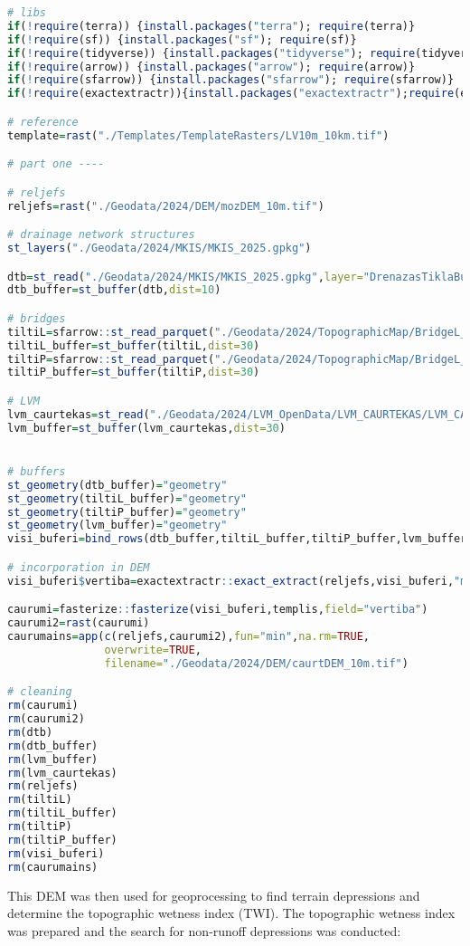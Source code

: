 \documentclass[
]{book}
\begin{document}
\begin{lstlisting}[language=R]
# libs
if(!require(terra)) {install.packages("terra"); require(terra)}
if(!require(sf)) {install.packages("sf"); require(sf)}
if(!require(tidyverse)) {install.packages("tidyverse"); require(tidyverse)}
if(!require(arrow)) {install.packages("arrow"); require(arrow)}
if(!require(sfarrow)) {install.packages("sfarrow"); require(sfarrow)}
if(!require(exactextractr)){install.packages("exactextractr");require(exactextractr)}

# reference
template=rast("./Templates/TemplateRasters/LV10m_10km.tif")

# part one ----

# reljefs
reljefs=rast("./Geodata/2024/DEM/mozDEM_10m.tif")

# drainage network structures
st_layers("./Geodata/2024/MKIS/MKIS_2025.gpkg")

dtb=st_read("./Geodata/2024/MKIS/MKIS_2025.gpkg",layer="DrenazasTiklaBuves")
dtb_buffer=st_buffer(dtb,dist=10)

# bridges 
tiltiL=sfarrow::st_read_parquet("./Geodata/2024/TopographicMap/BridgeL_COMB.parquet")
tiltiL_buffer=st_buffer(tiltiL,dist=30)
tiltiP=sfarrow::st_read_parquet("./Geodata/2024/TopographicMap/BridgeL_COMB.parquet")
tiltiP_buffer=st_buffer(tiltiP,dist=30)

# LVM
lvm_caurtekas=st_read("./Geodata/2024/LVM_OpenData/LVM_CAURTEKAS/LVM_CAURTEKAS_Shape.shp")
lvm_buffer=st_buffer(lvm_caurtekas,dist=30)


# buffers
st_geometry(dtb_buffer)="geometry"
st_geometry(tiltiL_buffer)="geometry"
st_geometry(tiltiP_buffer)="geometry"
st_geometry(lvm_buffer)="geometry"
visi_buferi=bind_rows(dtb_buffer,tiltiL_buffer,tiltiP_buffer,lvm_buffer)

# incorporation in DEM
visi_buferi$vertiba=exactextractr::exact_extract(reljefs,visi_buferi,"min")

caurumi=fasterize::fasterize(visi_buferi,templis,field="vertiba")
caurumi2=rast(caurumi)
caurumains=app(c(reljefs,caurumi2),fun="min",na.rm=TRUE,
               overwrite=TRUE,
               filename="./Geodata/2024/DEM/caurtDEM_10m.tif")

# cleaning
rm(caurumi)
rm(caurumi2)
rm(dtb)
rm(dtb_buffer)
rm(lvm_buffer)
rm(lvm_caurtekas)
rm(reljefs)
rm(tiltiL)
rm(tiltiL_buffer)
rm(tiltiP)
rm(tiltiP_buffer)
rm(visi_buferi)
rm(caurumains)
\end{lstlisting}

This DEM was then used for geoprocessing to find terrain depressions and
determine the topographic wetness index (TWI). The topographic
wetness index was prepared and the search for non-runoff depressions was conducted:
\end{document}
